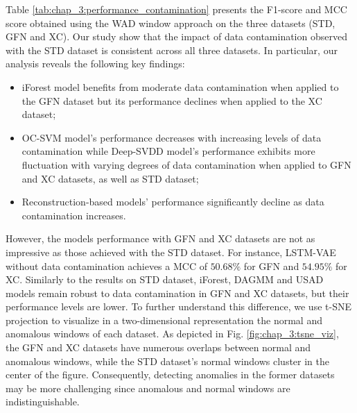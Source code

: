 Table \ref{tab:chap_3:performance_contamination} presents the F1-score and MCC score obtained using the WAD window approach on the three datasets (STD, GFN and XC). Our study show that the impact of data contamination observed with the STD dataset is consistent across all three datasets. In particular, our analysis reveals the following key findings:
\begin{itemize}
    \item iForest model benefits from moderate data contamination when applied to the GFN dataset but its performance declines when applied to the XC dataset;
    \item OC-SVM model's performance decreases with increasing levels of data contamination while Deep-SVDD model's performance exhibits more fluctuation with varying degrees of data contamination when applied to GFN and XC datasets, as well as STD dataset;
    \item Reconstruction-based models' performance significantly decline as data contamination increases. 
\end{itemize}
However, the models performance with GFN and XC datasets are not as impressive as those achieved with the STD dataset. For instance, LSTM-VAE without data contamination achieves a MCC of $50.68\%$ for GFN and $54.95\%$ for XC. Similarly to the results on STD dataset, iForest, DAGMM and USAD models remain robust to data contamination in GFN and XC datasets, but their performance levels are lower. To further understand this difference, we use t-SNE projection \cite{Maaten2008VisualizingDU} to visualize in a two-dimensional representation the normal and anomalous windows of each dataset. As depicted in Fig. \ref{fig:chap_3:tsne_viz}, the GFN and XC datasets have numerous overlaps between normal and anomalous windows, while the STD dataset's normal windows cluster in the center of the figure. Consequently, detecting anomalies in the former datasets may be more challenging since anomalous and normal windows are indistinguishable.




